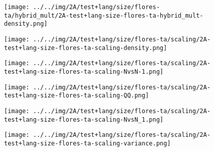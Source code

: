 \begin{figure}[H]
\centering	\texttt{[image: ../../img/2A/test+lang/size/flores-ta/hybrid\_mult/2A-test+lang-size-flores-ta-hybrid\_mult-density.png]}
\end{figure}
\begin{figure}[H]
\centering	\texttt{[image: ../../img/2A/test+lang/size/flores-ta/scaling/2A-test+lang-size-flores-ta-scaling-density.png]}
\end{figure}
\begin{figure}[H]
\centering	\texttt{[image: ../../img/2A/test+lang/size/flores-ta/scaling/2A-test+lang-size-flores-ta-scaling-NvsN-1.png]}
\end{figure}
\begin{figure}[H]
\centering	\texttt{[image: ../../img/2A/test+lang/size/flores-ta/scaling/2A-test+lang-size-flores-ta-scaling-QQ.png]}
\end{figure}
\begin{figure}[H]
\centering	\texttt{[image: ../../img/2A/test+lang/size/flores-ta/scaling/2A-test+lang-size-flores-ta-scaling-NvsN\_1.png]}
\end{figure}
\begin{figure}[H]
\centering	\texttt{[image: ../../img/2A/test+lang/size/flores-ta/scaling/2A-test+lang-size-flores-ta-scaling-variance.png]}
\end{figure}
